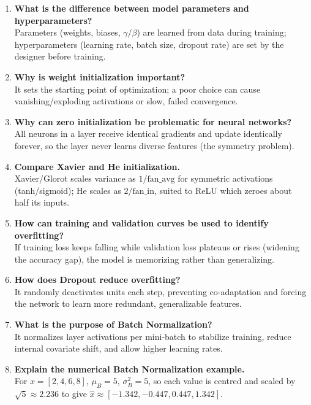 \documentclass[10pt]{article}
\begin{document}
\begin{enumerate}
\item \textbf{What is the difference between model parameters and hyperparameters?}\\
Parameters (weights, biases, $\gamma/\beta$) are learned from data during training; hyperparameters (learning rate, batch size, dropout rate) are set by the designer before training.

\item \textbf{Why is weight initialization important?}\\
It sets the starting point of optimization; a poor choice can cause vanishing/exploding activations or slow, failed convergence.

\item \textbf{Why can zero initialization be problematic for neural networks?}\\
All neurons in a layer receive identical gradients and update identically forever, so the layer never learns diverse features (the symmetry problem).

\item \textbf{Compare Xavier and He initialization.}\\
Xavier/Glorot scales variance as $1/\text{fan\_avg}$ for symmetric activations (tanh/sigmoid); He scales as $2/\text{fan\_in}$, suited to ReLU which zeroes about half its inputs.

\item \textbf{How can training and validation curves be used to identify overfitting?}\\
If training loss keeps falling while validation loss plateaus or rises (widening the accuracy gap), the model is memorizing rather than generalizing.

\item \textbf{How does Dropout reduce overfitting?}\\
It randomly deactivates units each step, preventing co-adaptation and forcing the network to learn more redundant, generalizable features.

\item \textbf{What is the purpose of Batch Normalization?}\\
It normalizes layer activations per mini-batch to stabilize training, reduce internal covariate shift, and allow higher learning rates.

\item \textbf{Explain the numerical Batch Normalization example.}\\
For $x=[2,4,6,8]$, $\mu_B=5$, $\sigma_B^2=5$, so each value is centred and scaled by $\sqrt5\approx2.236$ to give $\hat{x}\approx[-1.342,-0.447,0.447,1.342]$.


\end{enumerate}
\end{document}
